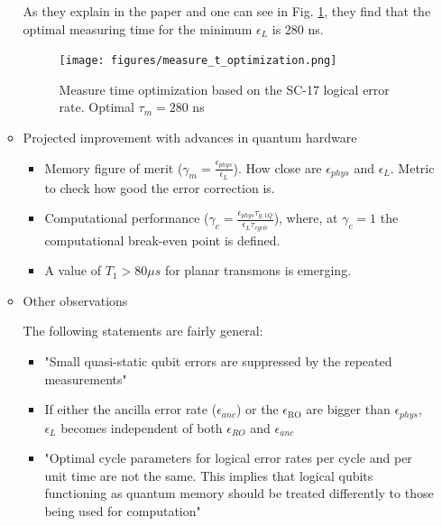 \begin{itemize}
\begin{itemize}
As they explain in the paper and one can see in Fig. \ref{fig:orgcef12cd}, they find that the optimal measuring time for the minimum \(\epsilon_L\) is 280 ns.

\begin{figure}[htbp]
\centering
\texttt{[image: figures/measure\_t\_optimization.png]}
\caption{\label{fig:orgcef12cd}
Measure time optimization based on the SC-17 logical error rate. Optimal \(\tau_m = 280\) ns}
\end{figure}


\item Projected improvement with advances in quantum hardware
\label{sec:orgdda5cb6}

\begin{itemize}
\item Memory figure of merit (\(\gamma_m = \frac{\epsilon_{phys}}{\epsilon_{L}}\)). How close are \(\epsilon_{phys}\) and \(\epsilon_{L}\). Metric to check how good the error correction is.

\item Computational performance (\(\gamma_c = \frac{\epsilon_{phys} \tau_{g,1Q}}{\epsilon_L \tau_{cycle}}\)), where, at \(\gamma_c = 1\) the computational break-even point is defined.

\item A value of \(T_1 > 80 \mu s\) for planar transmons is emerging.
\end{itemize}

\item Other observations
\label{sec:org2f68f4d}

The following statements are fairly general:

\begin{itemize}
\item "Small quasi-static qubit errors are suppressed by the repeated measurements"
\item If either the ancilla error rate (\(\epsilon_{anc}\)) or the \(\epsilon_{\text{RO}}\) are bigger than \(\epsilon_{phys}\), \(\epsilon_L\) becomes independent of both \(\epsilon_{RO}\) and \(\epsilon_{anc}\)
\item "Optimal cycle parameters for logical error rates per cycle and per unit time are not the same. This implies that logical qubits functioning as quantum memory should be treated differently to those being used for computation"
\end{itemize}
\end{itemize}
\end{itemize}


